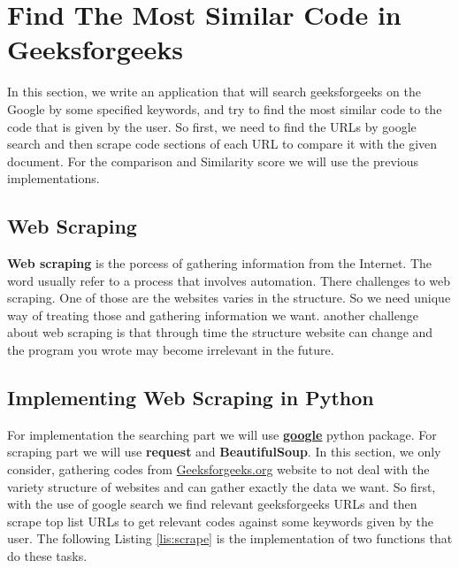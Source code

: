 \section{Find The Most Similar Code in Geeksforgeeks}
In this section, we write an application that will search 
geeksforgeeks on the Google by some specified keywords, and try 
to find the most similar code to the code that is given by the user.
So first, we need to find the URLs by google search and then scrape 
code sections of each URL to compare it with the given document. 
For the comparison and Similarity score we will use the previous 
implementations.


\subsection{Web Scraping}
\textbf{Web scraping} is the porcess of gathering information from the
Internet. The word usually refer to a process that involves automation.
There challenges to web scraping. One of those are the websites varies
in the structure. So we need unique way of treating those and gathering
information we want.
another challenge about web scraping is that through time the structure
website can change and the program you wrote may become irrelevant in the
future.

\subsection{Implementing Web Scraping in Python}
For implementation the searching part we will use \href{https://pypi.org/project/google/}{\textbf{google}} python package.
For scraping part we will use \textbf{request} and \textbf{BeautifulSoup}.
In this section, we only consider, gathering codes from
\href{https://www.geeksforgeeks.org/}{Geeksforgeeks.org} website to not 
deal with the variety structure of websites and can gather exactly the
data we want. So first, with the use of google search we find relevant geeksforgeeks
URLs and then scrape top list URLs to get relevant codes against some keywords
given by the user. The following Listing \ref{lis:scrape} is the implementation of two functions
that do these tasks.

